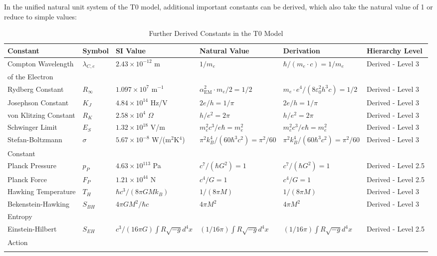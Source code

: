 \documentclass[12pt,a4paper]{article}
\newcommand{\alphaEM}{\alpha_{\text{EM}}}
\begin{document}
	In the unified natural unit system of the T0 model, additional important constants can be derived, which also take the natural value of 1 or reduce to simple values:
	
	\begin{table}[ht]
		\centering
		\begin{adjustbox}{scale=0.65}
			\begin{tabular}{llllll}
				\hline
				\textbf{Constant} & \textbf{Symbol} & \textbf{SI Value} & \textbf{Natural Value} & \textbf{Derivation} & \textbf{Hierarchy Level} \\
				\hline
				Compton Wavelength & $\lambda_{C,e}$ & $2.43 \times 10^{-12}$ m & $1/m_e$ & $\hbar/(m_e\cdot c) = 1/m_e$ & Derived - Level 3 \\
				of the Electron & & & & & \\
				Rydberg Constant & $R_\infty$ & $1.097 \times 10^7$ m$^{-1}$ & $\alphaEM^2\cdot m_e/2 = 1/2$ & $m_e\cdot e^4/(8\varepsilon_0^2h^3c) = 1/2$ & Derived - Level 3 \\
				Josephson Constant & $K_J$ & $4.84 \times 10^{14}$ Hz/V & $2e/h = 1/\pi$ & $2e/h = 1/\pi$ & Derived - Level 3 \\
				von Klitzing Constant & $R_K$ & $2.58 \times 10^4$ $\Omega$ & $h/e^2 = 2\pi$ & $h/e^2 = 2\pi$ & Derived - Level 3 \\
				Schwinger Limit & $E_S$ & $1.32 \times 10^{18}$ V/m & $m_e^2c^3/e\hbar = m_e^2$ & $m_e^2c^3/e\hbar = m_e^2$ & Derived - Level 3 \\
				Stefan-Boltzmann & $\sigma$ & $5.67 \times 10^{-8}$ W/(m$^2$K$^4$) & $\pi^2k_B^4/(60\hbar^3c^2) = \pi^2/60$ & $\pi^2k_B^4/(60\hbar^3c^2) = \pi^2/60$ & Derived - Level 3 \\
				Constant & & & & & \\
				Planck Pressure & $p_P$ & $4.63 \times 10^{113}$ Pa & $c^7/(\hbar G^2) = 1$ & $c^7/(\hbar G^2) = 1$ & Derived - Level 2.5 \\
				Planck Force & $F_P$ & $1.21 \times 10^{44}$ N & $c^4/G = 1$ & $c^4/G = 1$ & Derived - Level 2.5 \\
				Hawking Temperature & $T_H$ & $\hbar c^3/(8\pi GMk_B)$ & $1/(8\pi M)$ & $1/(8\pi M)$ & Derived - Level 3 \\
				Bekenstein-Hawking & $S_{BH}$ & $4\pi GM^2/\hbar c$ & $4\pi M^2$ & $4\pi M^2$ & Derived - Level 3 \\
				Entropy & & & & & \\
				Einstein-Hilbert & $S_{EH}$ & $c^3/(16\pi G)\int R\sqrt{-g} d^4x$ & $(1/16\pi)\int R\sqrt{-g} d^4x$ & $(1/16\pi)\int R\sqrt{-g} d^4x$ & Derived - Level 2.5 \\
				Action & & & & & \\
				\hline
				\multicolumn{5}{c}{} \\
				\hline
			\end{tabular}
		\end{adjustbox}
		\caption{Further Derived Constants in the T0 Model}
		\label{tab:derived_const}
	\end{table}
	
\end{document}
